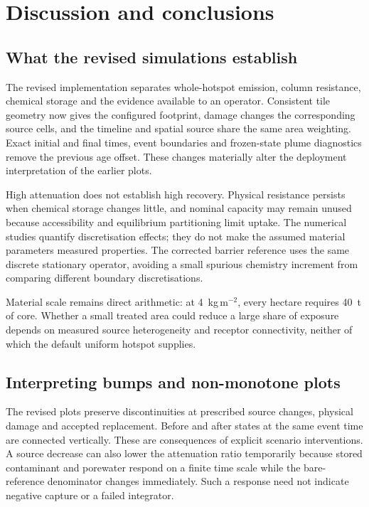 \section{Discussion and conclusions}
\label{sec:discussion}
\subsection{What the revised simulations establish}
The revised implementation separates whole-hotspot emission, column resistance, chemical storage and the evidence available to an operator. Consistent tile geometry now gives the configured footprint, damage changes the corresponding source cells, and the timeline and spatial source share the same area weighting. Exact initial and final times, event boundaries and frozen-state plume diagnostics remove the previous age offset. These changes materially alter the deployment interpretation of the earlier plots.

High attenuation does not establish high recovery. Physical resistance persists when chemical storage changes little, and nominal capacity may remain unused because accessibility and equilibrium partitioning limit uptake. The numerical studies quantify discretisation effects; they do not make the assumed material parameters measured properties. The corrected barrier reference uses the same discrete stationary operator, avoiding a small spurious chemistry increment from comparing different boundary discretisations.

Material scale remains direct arithmetic: at 4~kg\,m$^{-2}$, every hectare requires 40~t of core. Whether a small treated area could reduce a large share of exposure depends on measured source heterogeneity and receptor connectivity, neither of which the default uniform hotspot supplies.

\subsection{Interpreting bumps and non-monotone plots}
The revised plots preserve discontinuities at prescribed source changes, physical damage and accepted replacement. Before and after states at the same event time are connected vertically. These are consequences of explicit scenario interventions. A source decrease can also lower the attenuation ratio temporarily because stored contaminant and porewater respond on a finite time scale while the bare-reference denominator changes immediately. Such a response need not indicate negative capture or a failed integrator.


